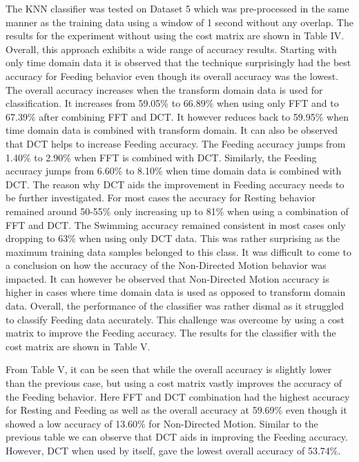 \documentclass[conference]{IEEEtran}
\begin{document}
The KNN classifier was tested on Dataset 5 which was pre-processed in the same manner as the training data using a window of 1 second without any overlap. The results for the experiment without using the cost matrix are shown in Table IV. Overall, this approach exhibits a wide range of accuracy results. Starting with only time domain data it is observed that the technique surprisingly had the best accuracy for Feeding behavior even though its overall accuracy was the lowest. The overall accuracy increases when the transform domain data is used for classification. It increases from 59.05\% to 66.89\% when using only FFT and to 67.39\% after combining FFT and DCT. It however reduces back to 59.95\% when time domain data is combined with transform domain. It can also be observed that DCT helps to increase Feeding accuracy. The Feeding accuracy jumps from 1.40\% to 2.90\% when FFT is combined with DCT. Similarly, the Feeding accuracy jumps from 6.60\% to 8.10\% when time domain data is combined with DCT. The reason why DCT aids the improvement in Feeding accuracy needs to be further investigated. For most cases the accuracy for Resting behavior remained around 50-55\% only increasing up to 81\% when using a combination of FFT and DCT. The Swimming accuracy remained consistent in most cases only dropping to 63\% when using only DCT data. This was rather surprising as the maximum training data samples belonged to this class. It was difficult to come to a conclusion on how the accuracy of the Non-Directed Motion behavior was impacted. It can however be observed that Non-Directed Motion accuracy is higher in cases where time domain data is used as opposed to transform domain data. Overall, the performance of the classifier was rather dismal as it struggled to classify Feeding data accurately. This challenge was overcome by using a cost matrix to improve the Feeding accuracy. The results for the classifier with the cost matrix are shown in Table V.


From Table V, it can be seen that while the overall accuracy is slightly lower than the previous case, but using a cost matrix vastly improves the accuracy of the Feeding behavior. Here FFT and DCT combination had the highest accuracy for Resting and Feeding as well as the overall accuracy at 59.69\% even though it showed a low accuracy of 13.60\% for Non-Directed Motion. Similar to the previous table we can observe that DCT aids in improving the Feeding accuracy. However, DCT when used by  itself,  gave the lowest overall accuracy of 53.74\%. 
\end{document}
